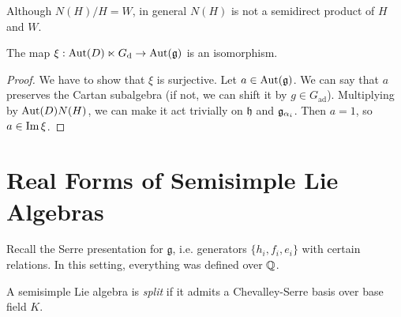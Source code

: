 \begin{remark}
  Although $N(H) / H = W$, in general
  $N(H)$ is not a semidirect product
  of $H$ and $W$.
\end{remark}

\begin{prop}
  The map
    $\xi : \operatorname{Aut}(D) \ltimes G_{\mathrm{d}}
    \to \operatorname{Aut}(\mathfrak{g})$
  is an isomorphism.
\end{prop}

\begin{proof}
  We have to show that $\xi$ is surjective.
  Let $a \in \operatorname{Aut}(\mathfrak{g})$. We can say that
  $a$ preserves the Cartan subalgebra
  (if not, we can shift it by $g \in G_{\mathrm{ad}}$).
  Multiplying by $\operatorname{Aut}(D) N(H)$,
  we can make it act trivially
  on $\mathfrak{h}$ and
  $\mathfrak{g}_{\alpha_i}$. Then $a = 1$, so
  $a \in \operatorname{Im} \xi$.
\end{proof}

\section{Real Forms of Semisimple Lie Algebras}

\begin{remark}
  Recall the Serre presentation for
  $\mathfrak{g}$, i.e. generators
  $\{h_i, f_i, e_i\}$ with certain
  relations. In this setting, everything
  was defined
  over $\mathbb{Q}$.
\end{remark}

\pagebreak
\begin{definition}
  A semisimple Lie algebra
  is \emph{split} if it admits a
  Chevalley-Serre basis over
  base field $K$.
\end{definition}


